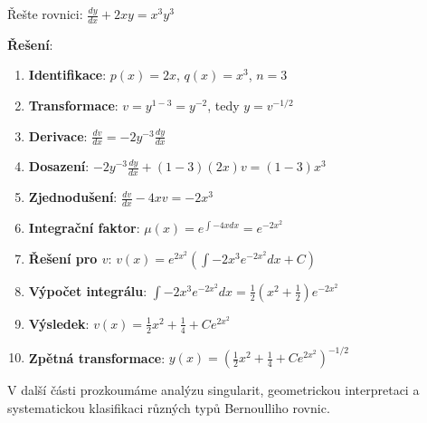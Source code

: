 \begin{example}
\label{ex:kompletni-transformace}
Řešte rovnici: $\frac{dy}{dx} + 2xy = x^3y^3$

\textbf{Řešení}:
\begin{enumerate}
\item \textbf{Identifikace}: $p(x) = 2x$, $q(x) = x^3$, $n = 3$
\item \textbf{Transformace}: $v = y^{1-3} = y^{-2}$, tedy $y = v^{-1/2}$
\item \textbf{Derivace}: $\frac{dv}{dx} = -2y^{-3}\frac{dy}{dx}$
\item \textbf{Dosazení}: $-2y^{-3}\frac{dy}{dx} + (1-3)(2x)v = (1-3)x^3$
\item \textbf{Zjednodušení}: $\frac{dv}{dx} - 4xv = -2x^3$
\item \textbf{Integrační faktor}: $\mu(x) = e^{\int -4x dx} = e^{-2x^2}$
\item \textbf{Řešení pro $v$}: $v(x) = e^{2x^2}\left(\int -2x^3 e^{-2x^2} dx + C\right)$
\item \textbf{Výpočet integrálu}: $\int -2x^3 e^{-2x^2} dx = \frac{1}{2}(x^2 + \frac{1}{2})e^{-2x^2}$
\item \textbf{Výsledek}: $v(x) = \frac{1}{2}x^2 + \frac{1}{4} + Ce^{2x^2}$
\item \textbf{Zpětná transformace}: $y(x) = \left(\frac{1}{2}x^2 + \frac{1}{4} + Ce^{2x^2}\right)^{-1/2}$
\end{enumerate}
\end{example}

\vspace{0.8\baselineskip}

\begin{transition}
V další části prozkoumáme analýzu singularit, geometrickou interpretaci a systematickou klasifikaci různých typů Bernoulliho rovnic.
\end{transition}
